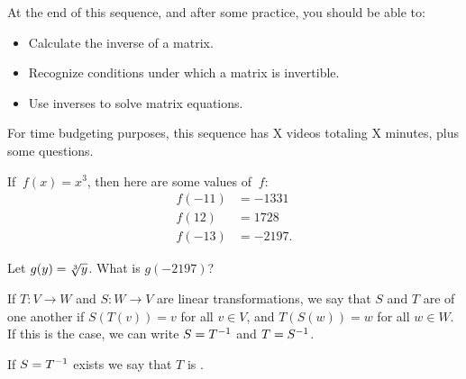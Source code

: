 







At the end of this sequence, and after some practice, you should be able to:

\begin{itemize}
\item Calculate the inverse of a matrix.  
\item Recognize conditions under which a matrix is invertible.   
\item Use inverses to solve matrix equations.  
\end{itemize}


For time budgeting purposes, this sequence has X videos totaling X minutes, 
plus some questions.  




\endedxtext

\endedxvertical





If $\ f(x) = x^3$, then here are some values of $\ f$:
\begin{align*} f(-11) &= -1331 \\ f(12) &= 1728 \\  f(-13) &= -2197. \end{align*}  

Let $g(y) = \displaystyle{\sqrt[3]{y}}$.  What is $g(-2197)$?


\endedxproblem



\endedxvertical





{}  
If $T: V \rightarrow W$ and $S: W \rightarrow V$ are linear transformations, we say that
$S$ and $T$ are {} of one another if $S(T(v)) = v$ for all $v\in V$, and
$T(S(w)) = w$ for all $w\in W$.  If this is the case, we can write $S = T^{-1}$ and $T = S^{-1}$.  

If $S = T^{-1}$ exists we say that $T$ is {}.  

